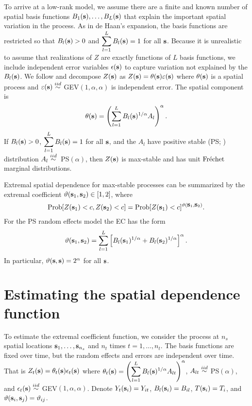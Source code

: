 \documentclass[11pt]{article}
\begin{document}
To arrive at a low-rank model, we assume there are a finite and known number of spatial basis functions $B_1(\mbox{\bf s}), \ldots, B_L(\mbox{\bf s})$ that explain the important spatial variation in the process.
As in de Haan's expansion, the basis functions are restricted so that $B_l(\mbox{\bf s}) > 0$ and $\displaystyle \sum_{l = 1}^L B_l(\mbox{\bf s}) = 1$ for all $\mbox{\bf s}$.
Because it is unrealistic to assume that realizations of $Z$ are exactly functions of $L$ basis functions, we include independent error variables $\epsilon(\mbox{\bf s})$ to capture variation not explained by the $B_l(\mbox{\bf s})$.
We follow \citet{Reich2012} and decompose $Z(\mbox{\bf s})$ as $Z(\mbox{\bf s})=\theta(\mbox{\bf s})\varepsilon(\mbox{\bf s})$ where $\theta(\mbox{\bf s})$ is a spatial process and $\varepsilon(\mbox{\bf s})\stackrel{iid}{\sim}$ GEV$(1,\alpha,\alpha)$ is independent error.
The spatial component is
\begin{align} \label{ebeq:theta}
  \theta(\mbox{\bf s}) = \left(\sum_{l=1}^LB_{l}(\mbox{\bf s})^{1/\alpha}A_{l}\right)^{\alpha}.
\end{align}
If $B_{l}(\mbox{\bf s})>0$, $\displaystyle \sum_{l=1}^LB_{l}(\mbox{\bf s})=1$ for all $\mbox{\bf s}$, and the $A_{l}$ have positive stable (PS; ) distribution \mbox{$A_{l}\stackrel{iid}{\sim}$ PS$(\alpha)$}, then $Z(\mbox{\bf s})$ is max-stable and has unit $\mbox{Fr$\acute{\mbox{e}}$chet }$ marginal distributions.

Extremal spatial dependence for max-stable processes can be summarized by the extremal coefficient \citep[EC]{Schlather2003} $\vartheta(\mbox{\bf s}_1, \mbox{\bf s}_2)\in[1,2]$, where
\begin{align} \label{ebeq:ECdev}
  \mbox{Prob}[Z(\mbox{\bf s}_1)<c, Z(\mbox{\bf s}_2)<c] = \mbox{Prob}[Z(\mbox{\bf s}_1)<c]^{\vartheta(\mbox{\bf s}_1,\mbox{\bf s}_2)}.
\end{align}
For the PS random effects model the EC has the form
\begin{align} \label{ebeq:EC}
   \vartheta(\mbox{\bf s}_1,\mbox{\bf s}_2) = \sum_{l=1}^L \left[B_{l}(\mbox{\bf s}_1)^{1/\alpha}+B_{l}(\mbox{\bf s}_2)^{1/\alpha}\right]^\alpha.
\end{align}
In particular, $\vartheta(\mbox{\bf s},\mbox{\bf s}) = 2^{\alpha}$ for all $\mbox{\bf s}$.


\section{Estimating the spatial dependence function}\label{ebs:estimation}

To estimate the extremal coefficient function, we consider the process at $n_s$ spatial locations $\mbox{\bf s}_1,\ldots,\mbox{\bf s}_{n_s}$ and $n_t$ times $t=1,\ldots,n_t$.
The basis functions are fixed over time, but the random effects and errors are independent over time.
That is $Z_t(\mbox{\bf s}) = \theta_t(\mbox{\bf s}) \epsilon_t(\mbox{\bf s})$ where $\theta_t(\mbox{\bf s}) = \left(\displaystyle \sum_{l=1}^L B_{l}(\mbox{\bf s})^{1/\alpha}A_{lt}\right)^{\alpha}$, $A_{lt} \stackrel{iid}{\sim}$ PS$(\alpha)$, and $\epsilon_t(\mbox{\bf s}) \stackrel{iid}{\sim}$ GEV$(1, \alpha, \alpha)$.
Denote $Y_t(\mbox{\bf s}_i) = Y_{it}$, $B_l(\mbox{\bf s}_i) = B_{il}$, $T(\mbox{\bf s}_i)=T_i$, and $\vartheta(\mbox{\bf s}_i,\mbox{\bf s}_j) = \vartheta_{ij}$.
\end{document}
